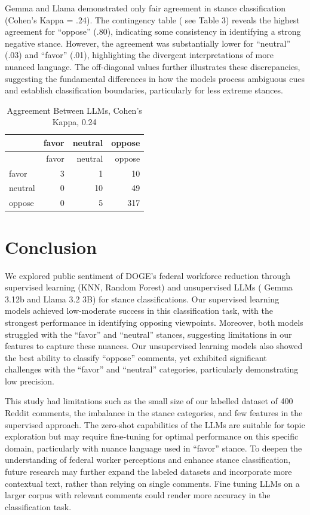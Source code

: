 \documentclass[
  12pt]{article}
\begin{document}
Gemma and Llama demonstrated only fair agreement in stance
classification (Cohen's Kappa = .24). The contingency table ( see Table
3) reveals the highest agreement for ``oppose'' (.80), indicating some
consistency in identifying a strong negative stance. However, the
agreement was substantially lower for ``neutral'' (.03) and ``favor''
(.01), highlighting the divergent interpretations of more nuanced
language. The off-diagonal values further illustrates these
discrepancies, suggesting the fundamental differences in how the models
process ambiguous cues and establish classification boundaries,
particularly for less extreme stances.

\begin{longtable}[]{@{}lrrr@{}}
\caption{Aggreement Between LLMs, Cohen's Kappa, 0.24}\tabularnewline
\toprule\noalign{}
& favor & neutral & oppose \\
\midrule\noalign{}
\endfirsthead
\toprule\noalign{}
& favor & neutral & oppose \\
\midrule\noalign{}
\endhead
\bottomrule\noalign{}
\endlastfoot
favor & 3 & 1 & 10 \\
neutral & 0 & 10 & 49 \\
oppose & 0 & 5 & 317 \\
\end{longtable}

\section{Conclusion}\label{conclusion}

We explored public sentiment of DOGE's federal workforce reduction
through supervised learning (KNN, Random Forest) and unsupervised LLMs (
Gemma 3.12b and Llama 3.2 3B) for stance classifications. Our supervised
learning models achieved low-moderate success in this classification
task, with the strongest performance in identifying opposing viewpoints.
Moreover, both models struggled with the ``favor'' and ``neutral''
stances, suggesting limitations in our features to capture these
nuances. Our unsupervised learning models also showed the best ability
to classify ``oppose'' comments, yet exhibited significant challenges
with the ``favor'' and ``neutral'' categories, particularly
demonstrating low precision.

This study had limitations such as the small size of our labelled
dataset of 400 Reddit comments, the imbalance in the stance categories,
and few features in the supervised approach. The zero-shot capabilities
of the LLMs are suitable for topic exploration but may require
fine-tuning for optimal performance on this specific domain,
particularly with nuance language used in ``favor'' stance. To deepen
the understanding of federal worker perceptions and enhance stance
classification, future research may further expand the labeled datasets
and incorporate more contextual text, rather than relying on single
comments. Fine tuning LLMs on a larger corpus with relevant comments
could render more accuracy in the classification task.
\end{document}
